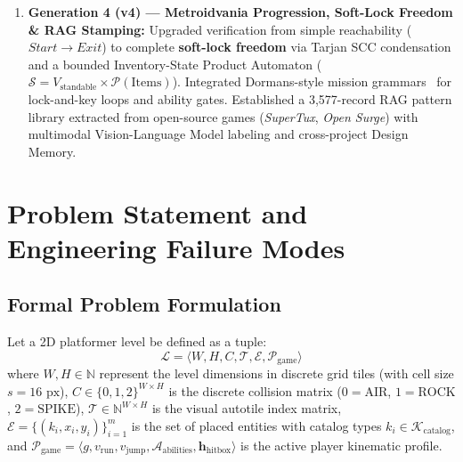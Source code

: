 \documentclass[11pt,a4paper]{report}
\theoremstyle{definition}
\theoremstyle{remark}
\begin{document}
\begin{enumerate}
    \item \textbf{Generation 4 (v4) --- Metroidvania Progression, Soft-Lock Freedom \& RAG Stamping:}
    Upgraded verification from simple reachability ($Start \to Exit$) to complete \textbf{soft-lock freedom} via Tarjan SCC condensation and a bounded Inventory-State Product Automaton ($\mathcal{S} = V_{\text{standable}} \times \mathcal{P}(\text{Items})$). Integrated Dormans-style mission grammars~\citep{dormans2010adventures} for lock-and-key loops and ability gates. Established a 3,577-record RAG pattern library extracted from open-source games (\emph{SuperTux}, \emph{Open Surge}) with multimodal Vision-Language Model labeling and cross-project Design Memory.
\end{enumerate}

\chapter{Problem Statement and Engineering Failure Modes}
\label{chap:problems}

\section{Formal Problem Formulation}
Let a 2D platformer level be defined as a tuple:
\begin{equation}
    \mathcal{L} = \langle W, H, C, \mathcal{T}, \mathcal{E}, \mathcal{P}_{\text{game}} \rangle
\end{equation}
where $W, H \in \mathbb{N}$ represent the level dimensions in discrete grid tiles (with cell size $s = 16\text{ px}$), $C \in \{0, 1, 2\}^{W \times H}$ is the discrete collision matrix ($0 = \text{AIR}$, $1 = \text{ROCK}$, $2 = \text{SPIKE}$), $\mathcal{T} \in \mathbb{N}^{W \times H}$ is the visual autotile index matrix, $\mathcal{E} = \{(k_i, x_i, y_i)\}_{i=1}^m$ is the set of placed entities with catalog types $k_i \in \mathcal{K}_{\text{catalog}}$, and $\mathcal{P}_{\text{game}} = \langle g, v_{\text{run}}, v_{\text{jump}}, \mathcal{A}_{\text{abilities}}, \mathbf{h}_{\text{hitbox}} \rangle$ is the active player kinematic profile.
\end{document}
